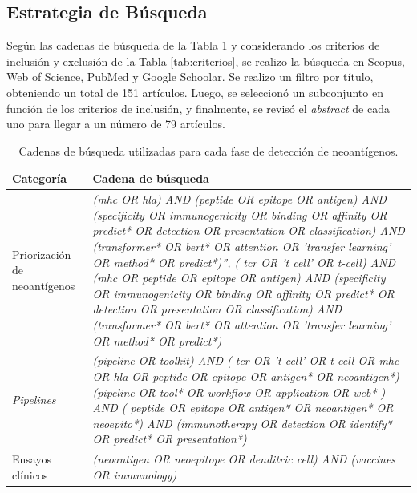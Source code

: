\subsection{Estrategia de Búsqueda}

Según las cadenas de búsqueda de la Tabla \ref{tab:search} y considerando los criterios de inclusión y exclusión de la Tabla \ref{tab:criterios}, se realizo la búsqueda en Scopus, Web of Science, PubMed y Google Schoolar. Se realizo un filtro por título, obteniendo un total de 151 artículos. Luego, se seleccionó un subconjunto en función de los criterios de inclusión, y finalmente, se revisó el \textit{abstract} de cada uno para llegar a un número de 79 artículos.

\begin{table}[]
	\caption{Cadenas de búsqueda utilizadas para cada fase de detección de neoantígenos.}
	\label{tab:search}
	\centering
	\small
	\setlength{\tabcolsep}{0.5em} %
	{\renewcommand{\arraystretch}{1.7}%
		\begin{tabular}{p{3cm}p{10cm}}
			\textbf{Categoría} & \textbf{Cadena de búsqueda} \\ \midrule
			Priorización de neoantígenos & \textit{(mhc OR hla) AND (peptide OR epitope OR antigen) AND (specificity OR immunogenicity OR binding OR affinity OR predict* OR detection OR presentation OR classification) AND (transformer* OR bert* OR attention OR 'transfer learning' OR method* OR predict*)'', ( tcr OR 't cell' OR t-cell) AND (mhc OR peptide OR epitope OR antigen) AND (specificity OR immunogenicity OR binding OR affinity OR predict* OR detection OR presentation OR classification) AND (transformer* OR bert* OR attention OR 'transfer learning' OR method* OR predict*)} \\
			
	
			\textit{Pipelines} & \textit{(pipeline OR toolkit) AND ( tcr OR 't cell' OR t-cell OR mhc OR hla OR peptide OR epitope OR antigen* OR neoantigen*) (pipeline OR tool* OR workflow OR application OR web* ) AND ( peptide OR epitope OR antigen* OR neoantigen* OR neoepito*) AND (immunotherapy OR detection OR identify* OR predict* OR presentation*)}\\
			
			Ensayos clínicos &  \textit{(neoantigen OR neoepitope OR denditric cell) AND (vaccines OR immunology)}
			
	\end{tabular}}
\end{table}




